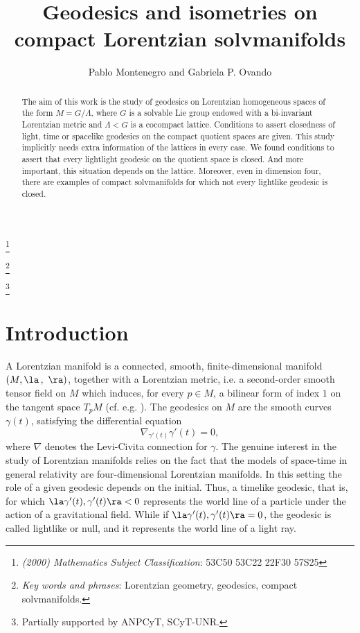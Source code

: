 \documentclass[12pt]{amsart}
\theoremstyle{plain}
\theoremstyle{definition}
\theoremstyle{remark}
\begin{document}
\title[Geodesics and isometries on compact Lorentzian solvmanifolds]{Geodesics and isometries on compact Lorentzian solvmanifolds}

\begin{abstract}
The aim of this work is the study of geodesics on Lorentzian homogeneous spaces of the form $M=G/\Lambda$, where $G$ is a solvable Lie group endowed with a bi-invariant Lorentzian metric and $\Lambda < G$ is a cocompact lattice. Conditions to assert closedness of light, time or spacelike geodesics on the compact quotient spaces are given. This study implicitly needs extra information of the lattices in every case. We found conditions to assert that every lightlight geodesic on the quotient space is closed. And more important, this situation depends on the lattice. Moreover, even in dimension four, there are examples of compact solvmanifolds for which not every lightlike geodesic is closed.
\end{abstract}

\author{Pablo Montenegro and Gabriela P. Ovando}

\let\today\relax %

\thanks{{\it (2000) Mathematics Subject Classification}: 53C50
	53C22
	22F30
	57S25}

\thanks{{\it Key words and phrases}: Lorentzian geometry, geodesics, compact solvmanifolds.}

\thanks{Partially supported by ANPCyT, SCyT-UNR.}

\address{Departamento de Matemática, ECEN - FCEIA, Universidad Nacional de Rosario, Pellegrini 250, 2000 Rosario, Santa Fe, Argentina.}


\maketitle

	
	
	\section{Introduction}
A Lorentzian manifold is a  connected, smooth, finite-dimensional manifold \\ $(M, \la \, , \ \ra)$, together with a Lorentzian metric, i.e. a second-order smooth
tensor field on $M$ which induces, for every $p\in M$, a bilinear form of index $1$ on the tangent
space $T_pM$ (cf. e.g. \cite{ON}). The geodesics on $M$ are the smooth curves $\gamma(t)$, satisfying the
differential equation
$$\nabla_{\gamma'(t)}\gamma'(t)=0,$$
where $\nabla$ denotes the Levi-Civita connection for $\gamma$. 	
	The genuine interest in the study of Lorentzian manifolds relies on the fact that the models of 	space-time in general relativity are four-dimensional Lorentzian manifolds. In this setting the role of a given geodesic depends on the initial. Thus, 	
a timelike geodesic, that is, for which  $\la \gamma'(t), \gamma'(t)\ra < 0$   represents the world line of a particle
	under the action of a gravitational field. While if $\la \gamma'(t), \gamma'(t)\ra = 0$, the geodesic is called lightlike or
	null, and it represents the world line of a light ray.
	
\end{document}
